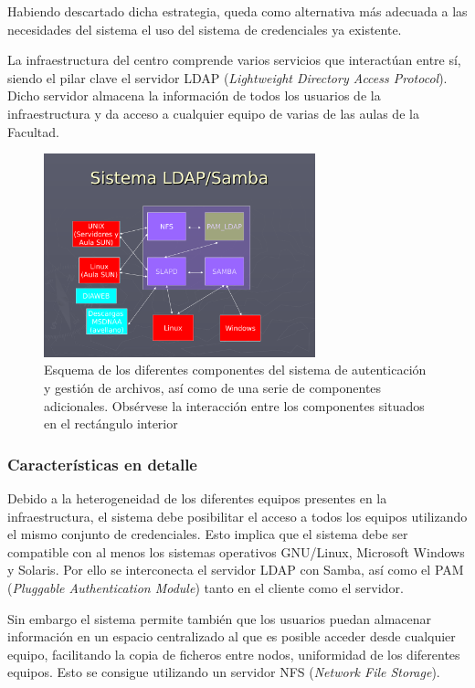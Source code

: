 Habiendo descartado dicha estrategia, queda como alternativa más adecuada a las necesidades del sistema el uso del sistema de credenciales ya existente.

La infraestructura del centro comprende varios servicios que interactúan entre sí, siendo el pilar clave el servidor LDAP (\textit{Lightweight Directory Access Protocol}). Dicho servidor almacena la información de todos los usuarios de la infraestructura y da acceso a cualquier equipo de varias de las aulas de la Facultad.

\begin{figure}[H]
	\centering
	\includegraphics[width=0.7\textwidth]{Chapter5/Figures/LDAP.pdf}
	\caption[Esquema de los componentes del sistema de autenticación y gestión de archivos]{Esquema de los diferentes componentes del sistema de autenticación y gestión de archivos, así como de una serie de componentes adicionales. Obsérvese la interacción entre los componentes situados en el rectángulo interior}
	\label{fig:arquitectura_ldap}
\end{figure}

\subsubsection{Características en detalle}

Debido a la heterogeneidad de los diferentes equipos presentes en la infraestructura, el sistema debe posibilitar el acceso a todos los equipos utilizando el mismo conjunto de credenciales. Esto implica que el sistema debe ser compatible con al menos los sistemas operativos GNU/Linux, Microsoft Windows y Solaris. Por ello se interconecta el servidor LDAP con Samba, así como el PAM (\textit{Pluggable Authentication Module}) tanto en el cliente como el servidor.

Sin embargo el sistema permite también que los usuarios puedan almacenar información en un espacio centralizado al que es posible acceder desde cualquier equipo, facilitando la copia de ficheros entre nodos, uniformidad de los diferentes equipos. Esto se consigue utilizando un servidor NFS (\textit{Network File Storage}).

